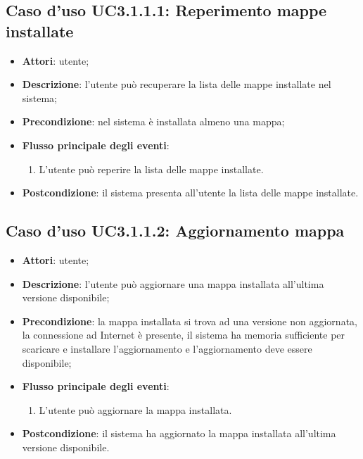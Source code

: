 \documentclass[../AnalisiDeiRequisiti.tex]{subfiles}
\begin{document}
\subsection{Caso d'uso UC3.1.1.1: Reperimento mappe installate}
\begin{itemize}
	\item \textbf{Attori}: utente;
	\item \textbf{Descrizione}: l'utente può recuperare la lista delle mappe installate nel sistema; 
	\item \textbf{Precondizione}: nel sistema è installata almeno una mappa;
	
	\item \textbf{Flusso principale degli eventi}:
	\begin{enumerate}
		\item L'utente può reperire la lista delle mappe installate.
		
	\end{enumerate}
	\item \textbf{Postcondizione}: il sistema presenta all'utente la lista delle mappe installate.
\end{itemize}
\hypertarget{UC3.1.1.2}{}
\subsection{Caso d'uso UC3.1.1.2: Aggiornamento mappa}
\begin{itemize}
	\item \textbf{Attori}: utente;
	\item \textbf{Descrizione}: l'utente può aggiornare una mappa installata all'ultima versione disponibile; 
	\item \textbf{Precondizione}: la mappa installata si trova ad una versione non aggiornata, la connessione ad Internet è presente, il sistema ha memoria sufficiente per scaricare e installare l'aggiornamento e l'aggiornamento deve essere disponibile;
	
	\item \textbf{Flusso principale degli eventi}:
	\begin{enumerate}
		\item L'utente può aggiornare la mappa installata.
		
	\end{enumerate}
	\item \textbf{Postcondizione}: il sistema ha aggiornato la mappa installata all'ultima versione disponibile.
\end{itemize}
\hypertarget{UC3.1.1.3}{}
\end{document}
